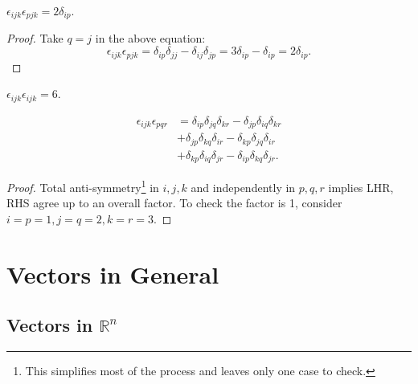 \documentclass[a4paper]{article}
\begin{document}
\begin{proposition}\label{prop:eeidentity2}
  $ \epsilon_{ijk}\epsilon_{pjk}=2\delta_{ip}. $
\end{proposition}
\begin{proof}
  Take $q=j$ in the above equation:
  \[
    \epsilon_{ijk}\epsilon_{pjk}=\delta_{ip}\delta_{jj}-\delta_{ij}\delta_{jp}=3\delta_{ip}-\delta_{ip}=2\delta_{ip}
  .\]
\end{proof}
\begin{proposition}\label{prop:eeidentity3}
  $  \epsilon_{ijk}\epsilon_{ijk}=6 $.
\end{proposition}
\begin{proposition}\label{prop:eeidentity4}
  \[
    \begin{aligned}
      \epsilon_{ijk}\epsilon_{pqr}&=\delta_{ip}\delta_{jq}\delta_{kr}-\delta_{jp}\delta_{iq}\delta_{kr}\\
      &+\delta_{jp}\delta_{kq}\delta_{ir}-\delta_{kp}\delta_{jq}\delta_{ir}\\
      &+\delta_{kp}\delta_{iq}\delta_{jr}-\delta_{ip}\delta_{kq}\delta_{jr}.
    \end{aligned}
  \]
\end{proposition}
\begin{proof}
  Total anti-symmetry\footnote{This simplifies most of the process
  and leaves only one case to check.} in $i,j,k$ and independently in
  $p,q,r$ implies LHR, RHS agree up to an overall factor. To check
  the factor is 1, consider $i=p=1, j=q=2, k=r=3$.
\end{proof}
\section{Vectors in General}
\subsection{Vectors in $ \mathbb{R}^n $}
\end{document}
